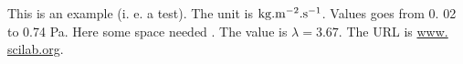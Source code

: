 This is an example (i.
e. a test).
The unit is $\rm kg.
	m^{-2}.s^{-1}$.
Values goes from 0.
02 to 0.74 Pa.
Here some space needed \hspace{0.
	5cm}.
The value is $\lambda=3.
	67$.
The URL is \url{www.
	scilab.org}.
